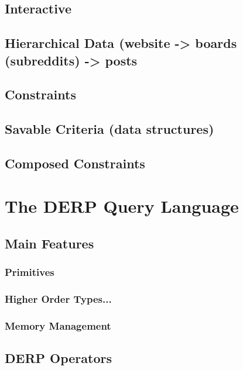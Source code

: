 \documentclass{book}
\begin{document}
\section{Interactive}
\section{Hierarchical Data (website -> boards (subreddits) -> posts}
\section{Constraints}
\section{Savable Criteria (data structures)}
\section{Composed Constraints}

\chapter{The DERP Query Language}
\section{Main Features}
\subsection{Primitives}
\subsection{Higher Order Types...}
\subsection{Memory Management}
\section{DERP Operators}
\end{document}
